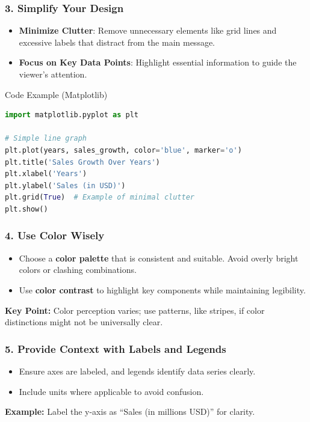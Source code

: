 \documentclass{beamer}
\begin{document}
\begin{frame}[fragile]
    \frametitle{3. Simplify Your Design}
    \begin{itemize}
        \item \textbf{Minimize Clutter}: Remove unnecessary elements like grid lines and excessive labels that distract from the main message.
        \item \textbf{Focus on Key Data Points}: Highlight essential information to guide the viewer’s attention.
    \end{itemize}
    \begin{block}{Code Example (Matplotlib)}
    \begin{lstlisting}[language=Python]
import matplotlib.pyplot as plt

# Simple line graph
plt.plot(years, sales_growth, color='blue', marker='o')
plt.title('Sales Growth Over Years')
plt.xlabel('Years')
plt.ylabel('Sales (in USD)')
plt.grid(True)  # Example of minimal clutter
plt.show()
    \end{lstlisting}
    \end{block}
\end{frame}

\begin{frame}[fragile]
    \frametitle{4. Use Color Wisely}
    \begin{itemize}
        \item Choose a \textbf{color palette} that is consistent and suitable. Avoid overly bright colors or clashing combinations.
        \item Use \textbf{color contrast} to highlight key components while maintaining legibility.
    \end{itemize}
    \textbf{Key Point:} Color perception varies; use patterns, like stripes, if color distinctions might not be universally clear.
\end{frame}

\begin{frame}[fragile]
    \frametitle{5. Provide Context with Labels and Legends}
    \begin{itemize}
        \item Ensure axes are labeled, and legends identify data series clearly.
        \item Include units where applicable to avoid confusion.
    \end{itemize}
    \textbf{Example:} Label the y-axis as “Sales (in millions USD)” for clarity.
\end{frame}
\end{document}
